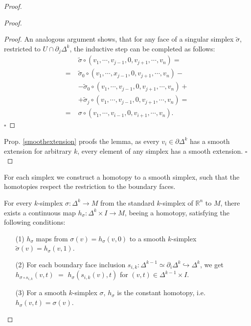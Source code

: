 \documentclass[envcountsect,runningheads]{llncs}
\renewcommand{\qed}{\hfill$\square$}
\begin{document}
\begin{proof}
\begin{proof}
\begin{proof}
An analogous argument shows, that for any face of a singular simplex $\tilde{\sigma}$, restricted to $U \cap \partial_j \Delta^k$, the inductive step can be completed as follows:
\begin{align}
&\tilde{\sigma} \circ \left(v_1,\cdots,v_{j-1},0,v_{j+1},\cdots, v_n\right) = \\
= \; &\tilde{\sigma}_0 \circ \left(v_1, \cdots, x_{j-1}, 0, v_{j+1}, \cdots, v_n\right) - \\
&- \tilde{\sigma}_0 \circ \left(v_1, \cdots, v_{j-1}, 0, v_{j+1}, \cdots, v_n\right) + \\
&+ \tilde{\sigma}_j \circ \left(v_1, \cdots, v_{j-1}, 0, v_{j+1}, \cdots, v_n\right) = \\
= \; &\sigma \circ \left(v_1, \cdots, v_{i-1}, 0, v_{i+1}, \cdots, v_n\right).
\end{align}
\qed
\end{proof}
Prop. \ref{smoothextension} proofs the lemma, as every $v_i \in \partial \Delta^k$ has a smooth extension for arbitrary $k$, every element of any simplex has a smooth extension.
\qed
\end{proof}

For each simplex we construct a homotopy to a smooth simplex, such that the homotopies respect the restriction to the boundary faces.

\begin{lemma}
\label{smoothhomtop}
For every $k$-simplex $\sigma: \Delta^k \rightarrow M$ from the standard $k$-simplex of $\mathbb{R}^n$ to $M$, there exists a continuous map $h_\sigma: \Delta^k \times I \rightarrow M$, beeing a homotopy, satisfying the following conditions:
\begin{itemize}
	\item[(1)] $h_\sigma$ maps from $\sigma(v) = h_\sigma(v,0)$ to a smooth $k$-simplex $\tilde{\sigma}(v) = h_\sigma(v,1)$.
	\item[(2)] For each boundary face inclusion $s_{i,k}: \Delta^{k-1} \simeq \partial_{i} \Delta^k \hookrightarrow \Delta^{k}$, we get \\$h_{\sigma \circ s_{i,k}}(v,t)$ $=$ $h_\sigma(s_{i,k}(v),t)$ for $(v,t) \in \Delta^{k-1} \times I$.
	\item[(3)] For a smooth $k$-simplex $\sigma$, $h_\sigma$ is the constant homotopy, i.e. $h_{\sigma}(v,t) = \sigma(v)$.
\end{itemize}
\end{lemma}


\end{proof}
\end{document}
